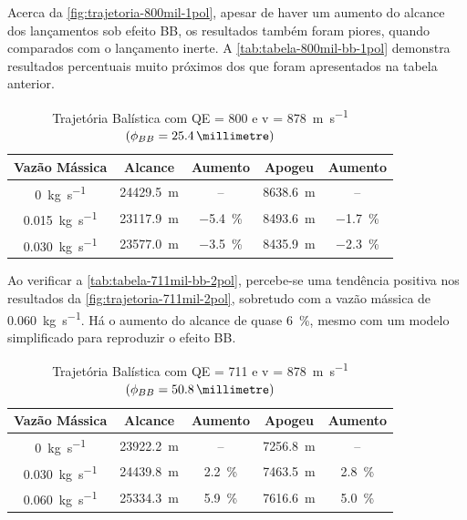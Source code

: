 Acerca da \autoref{fig:trajetoria-800mil-1pol}, apesar de haver um aumento do alcance dos lançamentos sob efeito BB, os resultados também foram piores, quando comparados com o lançamento inerte. A \autoref{tab:tabela-800mil-bb-1pol} demonstra resultados percentuais muito próximos dos que foram apresentados na tabela anterior.

\begin{table}[ht]
\centering
\caption[Trajetória Balística com QE = \qty{800}{\milliradian} e v = \qty{878}{\metre\per\second} $\left(\phi_{BB} = \qty{25,4}{\millimetre}\right)$]{Trajetória Balística com QE = \qty{800}{\milliradian} e v = \qty{878}{\metre\per\second} $\left(\phi_{BB} = \qty{25,4}{\millimetre}\right)$}
\vspace{0.5cm}
\begin{tabular}{c|c|c|c|c}
Vazão Mássica & Alcance & Aumento & Apogeu & Aumento \\
\hline
\qty{0}{\kilogram\per\second} & \qty{24429,5}{\metre} & -- & \qty{8638,6}{\metre} & -- \\ 
\qty{0,015}{\kilogram\per\second} & \qty{23117,9}{\metre} & \qty{-5,4}{\percent} & \qty{8493,6}{\metre} & \qty{-1,7}{\percent} \\
\qty{0,030}{\kilogram\per\second} & \qty{23577,0}{\metre} & \qty{-3,5}{\percent} & \qty{8435,9}{\metre} & \qty{-2,3}{\percent}
\end{tabular}
\label{tab:tabela-800mil-bb-1pol}
\end{table}

Ao verificar a \autoref{tab:tabela-711mil-bb-2pol}, percebe-se uma tendência positiva nos resultados da \autoref{fig:trajetoria-711mil-2pol}, sobretudo com a vazão mássica de \qty{0,060}{\kilogram\per\second}. Há o aumento do alcance de quase \qty{6}{\percent}, mesmo com um modelo simplificado para reproduzir o efeito BB.

\begin{table}[ht]
\centering
\caption[Trajetória Balística com QE = \qty{711}{\milliradian} e v = \qty{878}{\metre\per\second} $\left(\phi_{BB} = \qty{50,8}{\millimetre}\right)$]{Trajetória Balística com QE = \qty{711}{\milliradian} e v = \qty{878}{\metre\per\second} $\left(\phi_{BB} = \qty{50,8}{\millimetre}\right)$}
\vspace{0.5cm}
\begin{tabular}{c|c|c|c|c}
Vazão Mássica & Alcance & Aumento & Apogeu & Aumento \\
\hline
\qty{0}{\kilogram\per\second} & \qty{23922,2}{\metre} & -- & \qty{7256,8}{\metre} & -- \\
\qty{0,030}{\kilogram\per\second} & \qty{24439,8}{\metre} & \qty{2,2}{\percent} & \qty{7463,5}{\metre} & \qty{2,8}{\percent} \\
\qty{0,060}{\kilogram\per\second} & \qty{25334,3}{\metre} & \qty{5,9}{\percent} & \qty{7616,6}{\metre} & \qty{5,0}{\percent}
\end{tabular}
\label{tab:tabela-711mil-bb-2pol}
\end{table}

